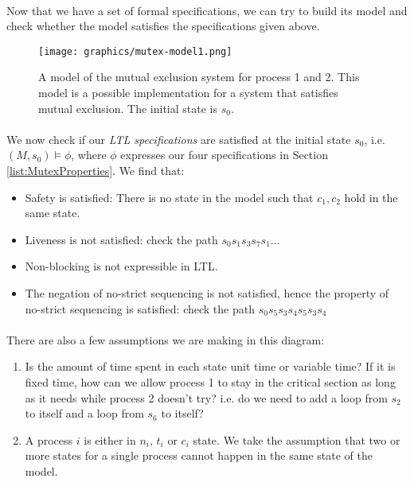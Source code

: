 \documentclass{article}
\theoremstyle{plain}
\theoremstyle{definition}
\begin{document}
\begin{multicols}{2}
\paragraph{} Now that we have a set of formal specifications, we can try to build its model and check whether the model satisfies the specifications given above. 

\begin{figure}[H]
\centering
\texttt{[image: graphics/mutex-model1.png]}
\caption{A model of the mutual exclusion system for process 1 and 2. This model is a possible implementation for a system that satisfies mutual exclusion. The initial state is $s_0$.}\label{fig:MutexModel1}
\end{figure}

\paragraph{} We now check if our \textit{LTL specifications} are satisfied at the initial state $s_0$, i.e. $(M, s_0) \models \phi$, where $\phi$ expresses our four specifications in Section \ref{list:MutexProperties}. We find that:

\begin{itemize}
\item Safety is satisfied: There is no state in the model such that $c_1, c_2$ hold in the same state.
\item Liveness is not satisfied: check the path $s_0s_1s_3s_7s_1...$
\item Non-blocking is not expressible in LTL.
\item The negation of no-strict sequencing is not satisfied, hence the property of no-strict sequencing is satisfied: check the path $s_0s_5s_3s_4s_5s_3s_4$
\end{itemize}

\paragraph{} There are also a few assumptions we are making in this diagram:

\begin{enumerate}
\item Is the amount of time spent in each state unit time or variable time? If it is fixed time, how can we allow process 1 to stay in the critical section as long as it needs while process 2 doesn't try? i.e. do we need to add a loop from $s_2$ to itself and a loop from $s_6$ to itself?
\item A process $i$ is either in $n_i$, $t_i$ or $c_i$ state. We take the assumption that two or more states for a single process cannot happen in the same state of the model.
\end{enumerate}


\end{multicols}
\end{document}
